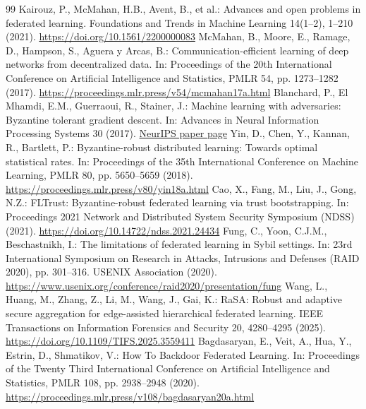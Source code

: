 \documentclass[runningheads,orivec]{llncs}
\begin{document}
\begingroup
\small
\begin{thebibliography}{99}
    \setlength{\itemsep}{0pt}
     Kairouz, P., McMahan, H.B., Avent, B., et al.: Advances and open problems in federated learning. Foundations and Trends in Machine Learning 14(1--2), 1--210 (2021). \url{https://doi.org/10.1561/2200000083}
     McMahan, B., Moore, E., Ramage, D., Hampson, S., Aguera y Arcas, B.: Communication-efficient learning of deep networks from decentralized data. In: Proceedings of the 20th International Conference on Artificial Intelligence and Statistics, PMLR 54, pp. 1273--1282 (2017). \url{https://proceedings.mlr.press/v54/mcmahan17a.html}
     Blanchard, P., El Mhamdi, E.M., Guerraoui, R., Stainer, J.: Machine learning with adversaries: Byzantine tolerant gradient descent. In: Advances in Neural Information Processing Systems 30 (2017). \href{https://papers.nips.cc/paper/6617-machine-learning-with-adversaries-byzantine-tolerant-gradient-descent}{NeurIPS paper page}
     Yin, D., Chen, Y., Kannan, R., Bartlett, P.: Byzantine-robust distributed learning: Towards optimal statistical rates. In: Proceedings of the 35th International Conference on Machine Learning, PMLR 80, pp. 5650--5659 (2018). \url{https://proceedings.mlr.press/v80/yin18a.html}
     Cao, X., Fang, M., Liu, J., Gong, N.Z.: FLTrust: Byzantine-robust federated learning via trust bootstrapping. In: Proceedings 2021 Network and Distributed System Security Symposium (NDSS) (2021). \url{https://doi.org/10.14722/ndss.2021.24434}
     Fung, C., Yoon, C.J.M., Beschastnikh, I.: The limitations of federated learning in Sybil settings. In: 23rd International Symposium on Research in Attacks, Intrusions and Defenses (RAID 2020), pp. 301--316. USENIX Association (2020). \url{https://www.usenix.org/conference/raid2020/presentation/fung}
     Wang, L., Huang, M., Zhang, Z., Li, M., Wang, J., Gai, K.: RaSA: Robust and adaptive secure aggregation for edge-assisted hierarchical federated learning. IEEE Transactions on Information Forensics and Security 20, 4280--4295 (2025). \url{https://doi.org/10.1109/TIFS.2025.3559411}
     Bagdasaryan, E., Veit, A., Hua, Y., Estrin, D., Shmatikov, V.: How To Backdoor Federated Learning. In: Proceedings of the Twenty Third International Conference on Artificial Intelligence and Statistics, PMLR 108, pp. 2938--2948 (2020). \url{https://proceedings.mlr.press/v108/bagdasaryan20a.html}

\end{thebibliography}
\end{document}
